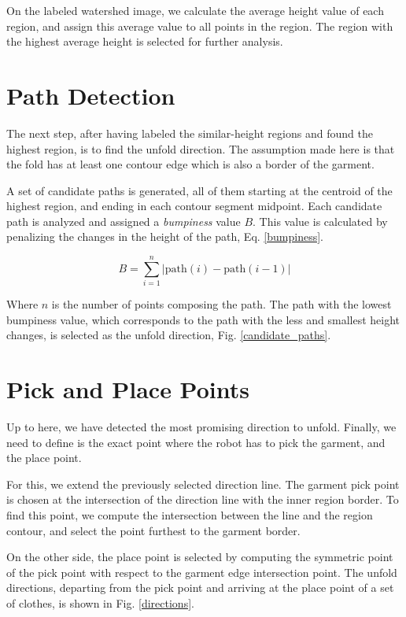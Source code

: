 On the labeled watershed image, we calculate the average height value of each region, and assign this average value to all points in the region. The region with the highest average height is selected for further analysis. 

\section{Path Detection}
The next step, after having labeled the similar-height regions and found the highest region, is to find the unfold direction. The assumption made here is that the fold has at least one contour edge which is also a border of the garment. 

A set of candidate paths is generated, all of them starting at the centroid of the highest region, and ending in each contour segment midpoint. Each candidate path is analyzed and assigned a \textit{bumpiness} value $B$. This value is calculated by penalizing the changes in the height of the path, Eq. \eqref{bumpiness}.

\begin{equation}\label{bumpiness}
B = \sum_{i=1}^{n} | \textrm{path}(i)- \textrm{path}(i-1) | 
\end{equation}

Where $n$ is the number of points composing the path. The path with the lowest bumpiness value, which corresponds to the path with the less and smallest height changes, is selected as the unfold direction, Fig. \ref{candidate_paths}.


\section{Pick and Place Points}
Up to here, we have detected the most promising direction to unfold. Finally, we need to define is the exact point where the robot has to pick the garment, and the place point. 

For this, we extend the previously selected direction line. The garment pick point is chosen at the intersection of the direction line with the inner region border. To find this point, we compute the intersection between the line and the region contour, and select the point furthest to the garment border.

On the other side, the place point is selected by computing the symmetric point of the pick point with respect to the garment edge intersection point. The unfold directions, departing from the pick point and arriving at the place point of a set of clothes, is shown in Fig. \ref{directions}.
